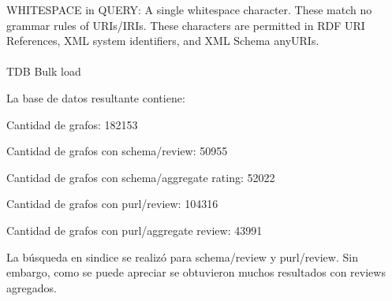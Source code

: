 WHITESPACE in QUERY: A single whitespace character. These match no grammar rules of URIs/IRIs. These characters are permitted in RDF URI References, XML system identifiers, and XML Schema anyURIs.
\\
\\
TDB Bulk load

La base de datos resultante contiene:

Cantidad de grafos: 182153

Cantidad de grafos con schema/review: 50955 

Cantidad de grafos con schema/aggregate rating: 52022

Cantidad de grafos con purl/review: 104316 

Cantidad de grafos con purl/aggregate review: 43991

La búsqueda en sindice se realizó para schema/review y purl/review. Sin embargo, como se puede apreciar se obtuvieron muchos resultados con reviews agregados.

